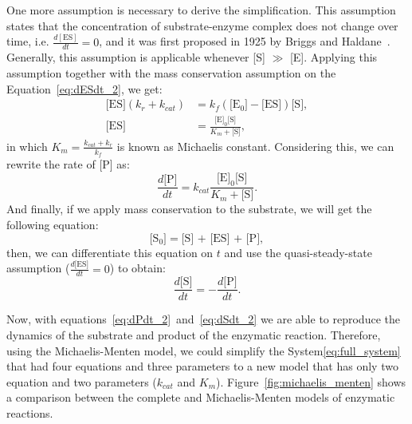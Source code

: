 One more assumption is necessary to derive the simplification. This 
assumption states that the concentration of substrate-enzyme complex
does not change over time, i.e. $\frac{d[\text{ES}]}{dt} = 0$, and it 
was first proposed in 1925 by Briggs and Haldane~\cite{Briggs1925}. 
Generally, this assumption is applicable whenever [S] $\gg$ [E]. 
Applying this assumption together with the mass conservation assumption 
on the Equation~\ref{eq:dESdt_2}, we get:
\begin{equation*}  
    \begin{aligned}
        \text{[ES]} (k_r + k_{cat}) &= 
            k_f(\text{[E$_0$]} - \text{[ES]})\text{[S]}, \\
        \text{[ES]} &= \frac{\text{[E]}_0\text{[S]}}{K_m + \text{[S]}}, 
    \end{aligned}
\end{equation*}
in which $K_m = \frac{k_{cat} + k_r}{k_f}$ is known as Michaelis 
constant. Considering this, we can rewrite the rate of [P] as:
\begin{equation}
    \frac{d\text{[P]}}{dt} = k_{cat}\frac{\text{[E]}_0\text{[S]}}
        {K_m + \text{[S]}}.
    \label{eq:dPdt_2}
\end{equation}
And finally, if we apply mass conservation to the substrate, we will get
the following equation:
\begin{equation*}
    \text{[S$_0$]} = \text{[S] + [ES] + [P]},
\end{equation*}
then, we can differentiate this equation on $t$ and use the 
quasi-steady-state assumption ($\frac{d\text{[ES]}}{dt} = 0$) to obtain:
\begin{equation}
    \frac{d\text{[S]}}{dt} = - \frac{d\text{[P]}}{dt}.
    \label{eq:dSdt_2}
\end{equation}

Now, with equations~\ref{eq:dPdt_2}~and~\ref{eq:dSdt_2} we are able to
reproduce the dynamics of the substrate and product of the enzymatic 
reaction. Therefore, using the Michaelis-Menten model, we could simplify 
the System\ref{eq:full_system} that had four equations and three 
parameters to a new model that has only two equation and two parameters 
($k_{cat}$ and $K_m$). Figure~\ref{fig:michaelis_menten} shows a 
comparison between the complete and Michaelis-Menten models of enzymatic 
reactions.

